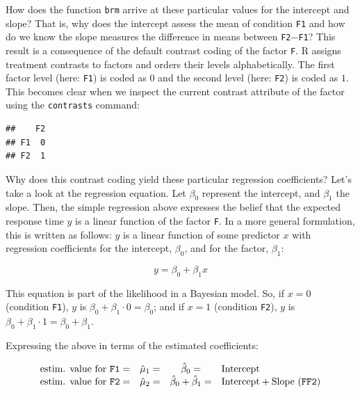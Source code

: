 \documentclass[12pt,]{krantz}
\newenvironment{Shaded}{\begin{snugshade}}{\end{snugshade}}
\newcommand{\KeywordTok}[1]{\textcolor[rgb]{0.13,0.29,0.53}{\textbf{#1}}}
\newcommand{\OperatorTok}[1]{\textcolor[rgb]{0.81,0.36,0.00}{\textbf{#1}}}
\newcommand{\NormalTok}[1]{#1}
\theoremstyle{definition}
\theoremstyle{definition}
\theoremstyle{definition}
\theoremstyle{remark}
\begin{document}
How does the function \texttt{brm} arrive at these particular values for
the intercept and slope? That is, why does the intercept assess the mean
of condition \texttt{F1} and how do we know the slope measures the
difference in means between \texttt{F2}\(-\)\texttt{F1}? This result is
a consequence of the default contrast coding of the factor \texttt{F}. R
assigns treatment contrasts to factors and orders their levels
alphabetically. The first factor level (here: \texttt{F1}) is coded as
\(0\) and the second level (here: \texttt{F2}) is coded as \(1\). This
becomes clear when we inspect the current contrast attribute of the
factor using the \texttt{contrasts} command:

\begin{Shaded}
\end{Shaded}

\begin{verbatim}
##    F2
## F1  0
## F2  1
\end{verbatim}

Why does this contrast coding yield these particular regression
coefficients? Let's take a look at the regression equation. Let
\(\beta_0\) represent the intercept, and \(\beta_1\) the slope. Then,
the simple regression above expresses the belief that the expected
response time \(y\) is a linear function of the factor \texttt{F}. In a
more general formulation, this is written as follows: \(y\) is a linear
function of some predictor \(x\) with regression coefficients for the
intercept, \(\beta_0\), and for the factor, \(\beta_1\):

\begin{equation}
y = \beta_0 + \beta_1x
\label{eq:lm1}
\end{equation}

This equation is part of the likelihood in a Bayesian model. So, if
\(x = 0\) (condition \texttt{F1}), \(y\) is
\(\beta_0 + \beta_1 \cdot 0 = \beta_0\); and if \(x = 1\) (condition
\texttt{F2}), \(y\) is
\(\beta_0 + \beta_1 \cdot 1 = \beta_0 + \beta_1\).

Expressing the above in terms of the estimated coefficients:

\begin{equation}
\begin{array}{lccll}
\text{estim. value for \texttt{F1}} = & \hat{\mu}_1 = & \hat{\beta}_0 = & \text{Intercept} \\
\text{estim. value for \texttt{F2}} = & \hat{\mu}_2 = & \hat{\beta}_0 + \hat{\beta}_1 = & \text{Intercept} + \text{Slope (\texttt{FF2})}
\end{array}
\label{eq:predVal}
\end{equation}
\end{document}
